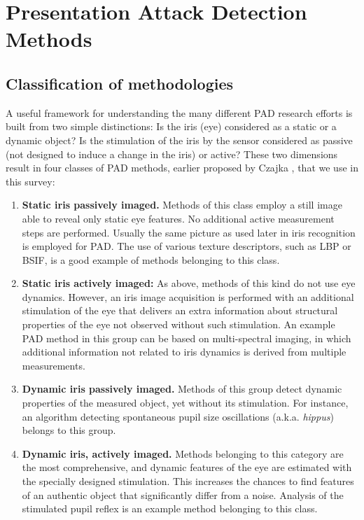 \documentclass[format=acmsmall, review=false, timestamp=false]{acmart}
\begin{document}
\section{Presentation Attack Detection Methods}
\label{sec:PADmethods}

\subsection{Classification of methodologies}
\label{sec:PADmethods_Classification}

A useful framework for understanding the many different PAD research efforts is built from two simple distinctions: Is the iris (eye) considered as a static or a dynamic object? Is the stimulation of the iris by the sensor considered as passive (not designed to induce a change in the iris) or active? These two dimensions result in four classes of PAD methods, earlier proposed by Czajka \cite{Czajka_TIFS_2015}, {that} we use in this survey:

\begin{enumerate}[label=\textbf{\arabic*})]
    \item {\bf Static iris passively imaged.} Methods of this class employ a still image able to reveal only static eye features. No additional active measurement steps are performed. Usually the same picture as used later in iris recognition is employed for PAD. The use of various texture descriptors, such as LBP or BSIF, is a good example of methods belonging to this class.
    
    \item {\bf Static iris actively imaged:} As above, methods of this kind do not use eye dynamics. However, an iris image acquisition is performed with an additional stimulation of the eye that delivers an extra information about structural properties of the eye not observed without such stimulation. An example PAD method in this group can be based on multi-spectral imaging, in which additional information not related to iris dynamics is derived from multiple measurements.
    
    \item {\bf Dynamic iris passively imaged.} Methods of this group detect dynamic properties of the measured object, yet without its stimulation. For instance, an algorithm detecting spontaneous pupil size oscillations (a.k.a. {\it hippus}) belongs to this group.
    
    \item {\bf Dynamic iris, actively imaged.} Methods belonging to this category are the most comprehensive, and dynamic features of the eye are estimated with the specially designed stimulation. This increases the chances to find features of an authentic object that significantly differ from a noise. {Analysis} of the stimulated pupil reflex is an example method belonging to this class.
\end{enumerate}
\end{document}
